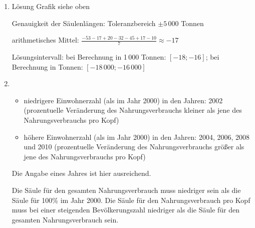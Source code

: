 \begin{langesbeispiel}
{\begin{enumerate}
\item Lösung Grafik siehe oben

Genauigkeit der Säulenlängen: Toleranzbereich $\pm 5\,000$ Tonnen

arithmetisches Mittel: $\frac{-53-17+20-32-45+17-10}{7}\approx -17$

Lösungsintervall: bei Berechnung in 1\,000 Tonnen: $[-18; -16]$; bei Berechnung in Tonnen:
$[-18\,000; -16\,000]$
	
\item \begin{itemize}
	\item niedrigere Einwohnerzahl (als im Jahr 2000) in den Jahren: 2002 (prozentuelle Veränderung des Nahrungsverbrauchs kleiner als jene des Nahrungsverbrauchs pro Kopf)
\item höhere Einwohnerzahl (als im Jahr 2000) in den Jahren: 2004, 2006, 2008 und 2010
(prozentuelle Veränderung des Nahrungsverbrauchs größer als jene des Nahrungsverbrauchs pro Kopf)
\end{itemize}
Die Angabe eines Jahres ist hier ausreichend.

Die Säule für den gesamten Nahrungsverbrauch muss niedriger sein als die Säule für
100\% im Jahr 2000. Die Säule für den Nahrungsverbrauch pro Kopf muss bei einer steigenden Bevölkerungszahl niedriger als die Säule für den gesamten Nahrungsverbrauch
sein.
			\end{enumerate}}
		\end{langesbeispiel}